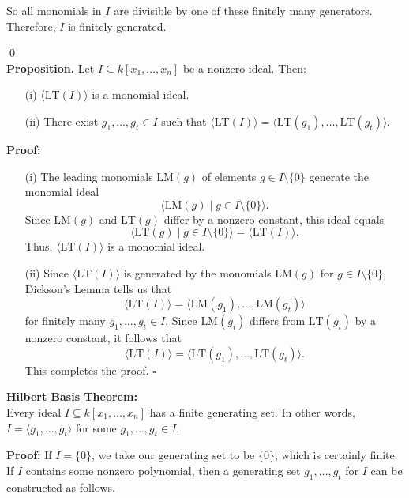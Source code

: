 \documentclass[11pt]{article}
\begin{document}
So all monomials in $I$ are divisible by one of these finitely many generators. Therefore, $I$ is finitely generated.

\qed \\
    \textbf{Proposition.} Let $I \subseteq k[x_1, \dots, x_n]$ be a nonzero ideal. Then:
    \begin{itemize}
        \item[(i)] $\langle \text{LT}(I) \rangle$ is a monomial ideal.
        \item[(ii)] There exist $g_1, \dots, g_t \in I$ such that $\langle \text{LT}(I) \rangle = \langle \text{LT}(g_1), \dots, \text{LT}(g_t) \rangle$.
    \end{itemize}
    \textbf{Proof:}
\begin{itemize}
    \item[(i)] The leading monomials \( \text{LM}(g) \) of elements \( g \in I \setminus \{0\} \) generate the monomial ideal 
    \[
    \langle \text{LM}(g) \mid g \in I \setminus \{0\} \rangle.
    \]
    Since \( \text{LM}(g) \) and \( \text{LT}(g) \) differ by a nonzero constant, this ideal equals 
    \[
    \langle \text{LT}(g) \mid g \in I \setminus \{0\} \rangle = \langle \text{LT}(I) \rangle.
    \]
    Thus, \( \langle \text{LT}(I) \rangle \) is a monomial ideal.

    \item[(ii)] Since \( \langle \text{LT}(I) \rangle \) is generated by the monomials \( \text{LM}(g) \) for \( g \in I \setminus \{0\} \), Dickson’s Lemma tells us that
    \[
    \langle \text{LT}(I) \rangle = \langle \text{LM}(g_1), \dots, \text{LM}(g_t) \rangle
    \]
    for finitely many \( g_1, \dots, g_t \in I \). Since \( \text{LM}(g_i) \) differs from \( \text{LT}(g_i) \) by a nonzero constant, it follows that
    \[
    \langle \text{LT}(I) \rangle = \langle \text{LT}(g_1), \dots, \text{LT}(g_t) \rangle.
    \]
    This completes the proof. \hfill \( \square \)
    \end{itemize} 
    \newpage

\textbf{Hilbert Basis Theorem:} \\
Every ideal \( I \subseteq k[x_1, \dots, x_n] \) has a finite generating set. In other words, \( I = \langle g_1, \dots, g_t \rangle \) for some \( g_1, \dots, g_t \in I \).

\textbf{Proof:}
If \( I = \{0\} \), we take our generating set to be \( \{0\} \), which is certainly finite. If \( I \) contains some nonzero polynomial, then a generating set \( g_1, \dots, g_t \) for \( I \) can be constructed as follows.
\end{document}
